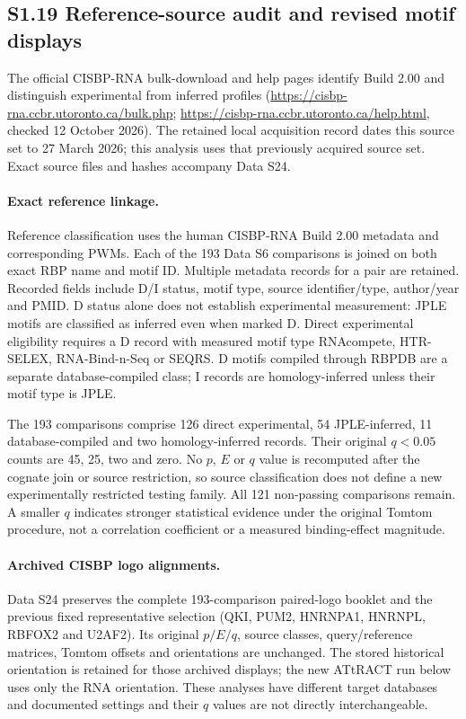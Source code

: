\documentclass[11pt]{article}
\begin{document}
\subsection*{S1.19 Reference-source audit and revised motif displays}

The official CISBP-RNA bulk-download and help pages identify Build 2.00 and distinguish experimental from inferred profiles (\url{https://cisbp-rna.ccbr.utoronto.ca/bulk.php}; \url{https://cisbp-rna.ccbr.utoronto.ca/help.html}, checked 12 October 2026). The retained local acquisition record dates this source set to 27 March 2026; this analysis uses that previously acquired source set. Exact source files and hashes accompany Data S24.

\paragraph{Exact reference linkage.} Reference classification uses the human CISBP-RNA Build 2.00  metadata and corresponding PWMs. Each of the 193 Data S6 comparisons is joined on both exact RBP name and motif ID. Multiple metadata records for a pair are retained. Recorded fields include D/I status, motif type, source identifier/type, author/year and PMID. D status alone does not establish experimental measurement: JPLE motifs are classified as inferred even when marked D. Direct experimental eligibility requires a D record with measured motif type RNAcompete, HTR-SELEX, RNA-Bind-n-Seq or SEQRS. D motifs compiled through RBPDB are a separate database-compiled class; I records are homology-inferred unless their motif type is JPLE.

The 193 comparisons comprise 126 direct experimental, 54 JPLE-inferred, 11 database-compiled and two homology-inferred records. Their original $q<0.05$ counts are 45, 25, two and zero. No $p$, $E$ or $q$ value is recomputed after the cognate join or source restriction, so source classification does not define a new experimentally restricted testing family. All 121 non-passing comparisons remain. A smaller $q$ indicates stronger statistical evidence under the original Tomtom procedure, not a correlation coefficient or a measured binding-effect magnitude.

\paragraph{Archived CISBP logo alignments.} Data S24 preserves the complete 193-comparison paired-logo booklet and the previous fixed representative selection (QKI, PUM2, HNRNPA1, HNRNPL, RBFOX2 and U2AF2). Its original $p/E/q$, source classes, query/reference matrices, Tomtom offsets and orientations are unchanged. The stored historical orientation is retained for those archived displays; the new ATtRACT run below uses only the RNA orientation. These analyses have different target databases and documented settings and their $q$ values are not directly interchangeable.
\end{document}
